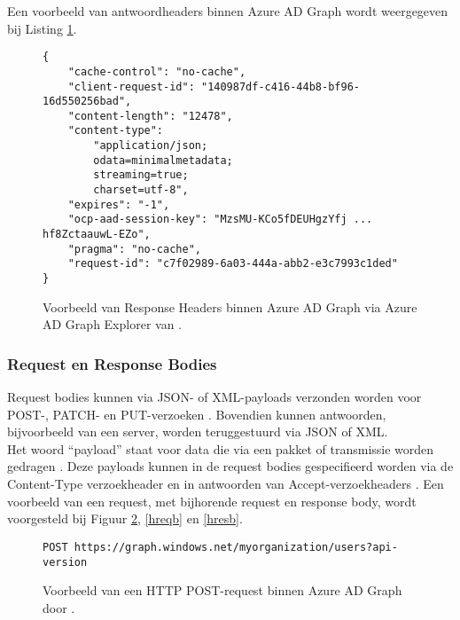 Een voorbeeld van antwoordheaders binnen Azure \ac{AD} Graph wordt weergegeven bij Listing \ref{rhaad}. \\

\begin{figure}[h!]
    \scriptsize
    \begin{verbatim} 
{
    "cache-control": "no-cache",
    "client-request-id": "140987df-c416-44b8-bf96-16d550256bad",
    "content-length": "12478",
    "content-type": 
        "application/json; 
        odata=minimalmetadata; 
        streaming=true; 
        charset=utf-8",
    "expires": "-1",
    "ocp-aad-session-key": "MzsMU-KCo5fDEUHgzYfj ... hf8ZctaauwL-EZo",
    "pragma": "no-cache",
    "request-id": "c7f02989-6a03-444a-abb2-e3c7993c1ded"
}
    \end{verbatim}
    \caption[Voorbeeld Response Headers Azure AD Graph]{Voorbeeld van Response Headers binnen Azure \ac{AD} Graph via Azure \Ac{AD} Graph Explorer van \textcite{Microsoft}.}
    \label{rhaad}
\end{figure}

\subsubsection{Request en Response Bodies}

Request bodies kunnen via \Ac{JSON}- of \ac{XML}-payloads verzonden worden voor POST-, PATCH- en PUT-verzoeken \autocite{Microsoft2015}. Bovendien kunnen antwoorden, bijvoorbeeld van een server, worden teruggestuurd via \ac{JSON} of \ac{XML}. \\

Het woord “payload” staat voor data die via een pakket of transmissie worden gedragen \autocite{Comer2006}. Deze payloads kunnen in de request bodies gespecifieerd worden via de Content-Type verzoekheader en in antwoorden van Accept-verzoekheaders \autocite{Microsoft2015}. Een voorbeeld van een request, met bijhorende request en response body, wordt voorgesteld bij Figuur \ref{hpr}, \ref{hreqb} en \ref{hresb}. \\

\begin{figure}[h!]
    \scriptsize
    \begin{verbatim}
POST https://graph.windows.net/myorganization/users?api-version
    \end{verbatim}
    \caption[Voorbeeld HTTP POST-request]{Voorbeeld van een \ac{HTTP} POST-request binnen Azure \ac{AD} Graph door \textcite{Microsoft2015}.}
    \label{hpr}
\end{figure}

